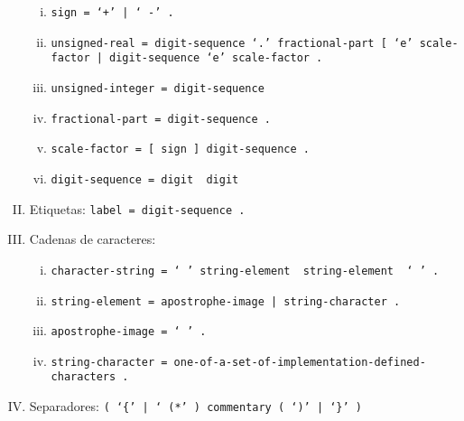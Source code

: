 \begin{enumerate}[I.]
\begin{enumerate}[i.]
\item \texttt{sign = \textquoteleft +\textquoteright\ | \textquoteleft
-\textquoteright\ .}

\item \texttt{unsigned-real = digit-sequence \textquoteleft .\textquoteright\
fractional-part [ \textquoteleft e\textquoteright\ scale-factor
                              | digit-sequence \textquoteleft e\textquoteright\
scale-factor .}
\item \texttt{unsigned-integer = digit-sequence }

\item \texttt{fractional-part = digit-sequence .}

\item \texttt{scale-factor = [ sign ] digit-sequence .}

\item \texttt{digit-sequence = digit { digit }}

\end{enumerate}

\item Etiquetas: \texttt{label = digit-sequence .}

\item Cadenas de caracteres:

\begin{enumerate}[i.]

\item \texttt{character-string = \textquoteleft \textquotesingle
\textquoteright\ string-element { string-element } \textquoteleft
\textquotesingle \textquoteright\ .}

\item \texttt{string-element = apostrophe-image | string-character .}

\item \texttt{apostrophe-image = \textquoteleft \textquotesingle\textquotesingle
\textquoteright\ .}

\item \texttt{string-character =
one-of-a-set-of-implementation-defined-characters .}

\end{enumerate}

\item Separadores: \texttt{( \textquoteleft \{\textquoteright\ | \textquoteleft
(*\textquoteright\ ) commentary ( \textquoteleft *)\textquoteright\ |
\textquoteleft \}\textquoteright\ )}

\end{enumerate}

